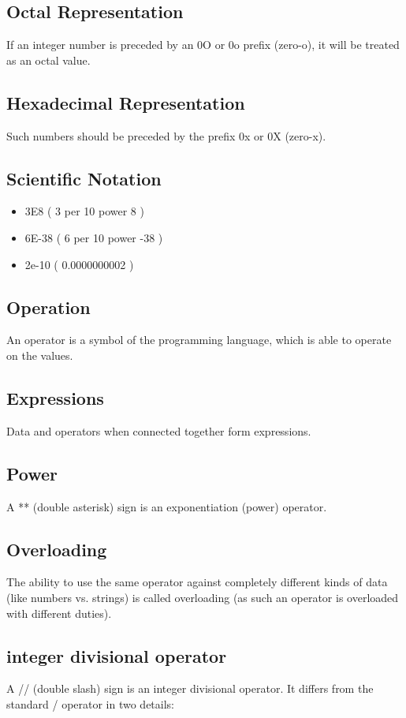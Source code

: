 \documentclass[11pt]{article}
\begin{document}
\subsection{Octal Representation}
\label{sec:org96c76f8}
If an integer number is preceded by an 0O or 0o prefix (zero-o), it
will be treated as an octal value.
\subsection{Hexadecimal Representation}
\label{sec:org20df1ea}
Such numbers should be preceded by the prefix 0x or 0X (zero-x).
\subsection{Scientific Notation}
\label{sec:org0198bc5}
\begin{itemize}
\item 3E8 ( 3 per 10 power 8 )
\item 6E-38 ( 6 per 10 power -38 )
\item 2e-10 ( 0.0000000002 )
\end{itemize}
\subsection{Operation}
\label{sec:org3b832c3}
An operator is a symbol of the programming language, which is able to
operate on the values.
\subsection{Expressions}
\label{sec:org693f692}
Data and operators when connected together form expressions.
\subsection{Power}
\label{sec:orgd8e18fc}
A ** (double asterisk) sign is an exponentiation (power) operator.
\subsection{Overloading}
\label{sec:orgb2d6e2d}
The ability to use the same operator against completely different
kinds of data (like numbers vs. strings) is called overloading (as
such an operator is overloaded with different duties).
\subsection{integer divisional operator}
\label{sec:orgaf7498b}
A // (double slash) sign is an integer divisional operator. It differs
from the standard / operator in two details:
\end{document}
